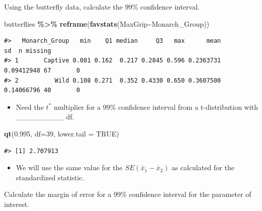 \documentclass[
]{report}
\newenvironment{Shaded}{\begin{snugshade}}{\end{snugshade}}
\newcommand{\AttributeTok}[1]{\textcolor[rgb]{0.13,0.29,0.53}{#1}}
\newcommand{\ConstantTok}[1]{\textcolor[rgb]{0.56,0.35,0.01}{#1}}
\newcommand{\DecValTok}[1]{\textcolor[rgb]{0.00,0.00,0.81}{#1}}
\newcommand{\FloatTok}[1]{\textcolor[rgb]{0.00,0.00,0.81}{#1}}
\newcommand{\FunctionTok}[1]{\textcolor[rgb]{0.13,0.29,0.53}{\textbf{#1}}}
\newcommand{\NormalTok}[1]{#1}
\newcommand{\SpecialCharTok}[1]{\textcolor[rgb]{0.81,0.36,0.00}{\textbf{#1}}}
\providecommand{\tightlist}{%
  \setlength{\itemsep}{0pt}\setlength{\parskip}{0pt}}
\begin{document}
\vspace{0.8in}

Using the butterfly data, calculate the 99\% confidence interval.

\begin{Shaded}
\begin{Highlighting}[]
\NormalTok{butterflies }\SpecialCharTok{\%\textgreater{}\%}
    \FunctionTok{reframe}\NormalTok{(}\FunctionTok{favstats}\NormalTok{(MaxGrip}\SpecialCharTok{\textasciitilde{}}\NormalTok{Monarch\_Group))}
\end{Highlighting}
\end{Shaded}

\begin{verbatim}
#>   Monarch_Group   min    Q1 median     Q3   max      mean         sd  n missing
#> 1       Captive 0.081 0.162  0.217 0.2845 0.596 0.2363731 0.09412948 67       0
#> 2          Wild 0.108 0.271  0.352 0.4330 0.650 0.3607500 0.14066796 40       0
\end{verbatim}

\begin{itemize}
\tightlist
\item
  Need the \(t^*\) multiplier for a 99\% confidence interval from a t-distribution with \_\_\_\_\_\_\_\_\_ df.
\end{itemize}

\begin{Shaded}
\begin{Highlighting}[]
\FunctionTok{qt}\NormalTok{(}\FloatTok{0.995}\NormalTok{, }\AttributeTok{df=}\DecValTok{39}\NormalTok{, }\AttributeTok{lower.tail =} \ConstantTok{TRUE}\NormalTok{)}
\end{Highlighting}
\end{Shaded}

\begin{verbatim}
#> [1] 2.707913
\end{verbatim}

\begin{itemize}
\tightlist
\item
  We will use the same value for the \(SE(\bar{x}_1-\bar{x}_2)\) as calculated for the standardized statistic.
\end{itemize}

\vspace{1in}

Calculate the margin of error for a 99\% confidence interval for the parameter of interest.

\vspace{0.5in}
\end{document}
